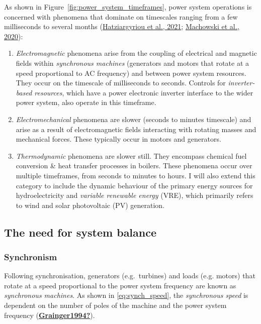 \documentclass[12pt,a4paper,]{report}
\begin{document}
As shown in Figure~\ref{fig:power_system_timeframes}, power system
operations is concerned with phenomena that dominate on timescales
ranging from a few milliseconds to several months
(\protect\hyperlink{ref-hatziargyriouDefinitionClassificationPower2021}{Hatziargyriou
et al., 2021};
\protect\hyperlink{ref-machowskiPowerSystemDynamics2020}{Machowski et
al., 2020}):

\begin{enumerate}
\def\labelenumi{\arabic{enumi}.}
\item
  \emph{Electromagnetic} phenomena arise from the coupling of electrical
  and magnetic fields within \emph{synchronous machines} (generators and
  motors that rotate at a speed proportional to AC frequency) and
  between power system resources. They occur on the timescale of
  milliseconds to seconds. Controls for \emph{inverter-based resources},
  which have a power electronic inverter interface to the wider power
  system, also operate in this timeframe.
\item
  \emph{Electromechanical} phenomena are slower (seconds to minutes
  timescale) and arise as a result of electromagnetic fields interacting
  with rotating masses and mechanical forces. These typically occur in
  motors and generators.
\item
  \emph{Thermodynamic} phenomena are slower still. They encompass
  chemical fuel conversion \& heat transfer processes in boilers. These
  phenomena occur over multiple timeframes, from seconds to minutes to
  hours. I will also extend this category to include the dynamic
  behaviour of the primary energy sources for hydroelectricity and
  \emph{variable renewable energy} (VRE), which primarily refers to wind
  and solar photovoltaic (PV) generation.
\end{enumerate}

\hypertarget{the-need-for-system-balance}{%
\subsection{The need for system
balance}\label{the-need-for-system-balance}}

\hypertarget{synchronism}{%
\subsubsection{Synchronism}\label{synchronism}}

Following synchronisation, generators (e.g.~turbines) and loads (e.g.
motors) that rotate at a speed proportional to the power system
frequency are known as \emph{synchronous machines}. As shown in
\protect\hyperlink{eq:synch_speed}{{[}eq:synch\_speed{]}}, the
\emph{synchronous speed} is dependent on the number of poles of the
machine and the power system frequency
(\protect\hyperlink{ref-Grainger1994}{\textbf{Grainger1994?}}).
\end{document}
